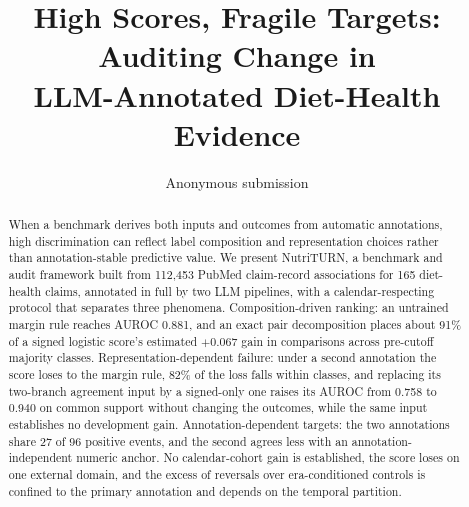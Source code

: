\documentclass[11pt]{article}
\title{High Scores, Fragile Targets: Auditing Change in\\LLM-Annotated Diet-Health Evidence}
\author{Anonymous submission}
\newcommand{\method}{NutriTURN\xspace}
\begin{document}
\maketitle

\begin{abstract}
When a benchmark derives both inputs and outcomes from automatic annotations, high discrimination
can reflect label composition and representation choices rather than annotation-stable predictive
value. We present \method, a benchmark and audit framework built from 112{,}453 PubMed
claim-record associations for 165 diet-health claims, annotated in full by two LLM pipelines, with
a calendar-respecting protocol that separates three phenomena. Composition-driven ranking: an
untrained margin rule reaches AUROC 0.881, and an exact pair decomposition places about 91\% of a
signed logistic score's estimated $+0.067$ gain in comparisons across pre-cutoff majority
classes. Representation-dependent failure: under a second annotation the score loses to the
margin rule, 82\% of the loss falls within classes, and replacing its two-branch agreement input
by a signed-only one raises its AUROC from 0.758 to 0.940 on common support without changing the
outcomes, while the same input establishes no development gain. Annotation-dependent targets:
the two annotations share 27 of 96 positive events, and the second agrees less with an
annotation-independent numeric anchor. No calendar-cohort gain is established, the score loses on
one external domain, and the excess of reversals over era-conditioned controls is confined to the
primary annotation and depends on the temporal partition.
\end{abstract}
\end{document}
